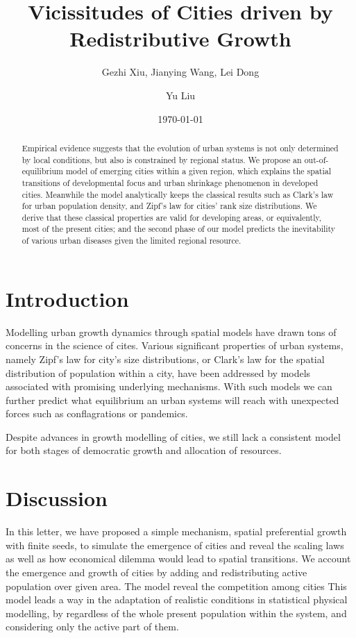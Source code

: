 \documentclass[reprint,unsortedaddress,amsmath,amssymb,aps,prl,showkeys]{revtex4-2}
\begin{document}
\title{Vicissitudes of Cities driven by Redistributive Growth}
\author{Gezhi Xiu, Jianying Wang, Lei Dong}
\author{Yu Liu}
\date{\today}

\begin{abstract}
    Empirical evidence suggests that the evolution of urban systems is not only determined by local conditions, but also is constrained by regional status. We propose an out-of-equilibrium model of emerging cities within a given region, which explains the spatial transitions of developmental focus and urban shrinkage phenomenon in developed cities. Meanwhile the model analytically keeps the classical results such as Clark's law for urban population density, and Zipf's law for cities' rank size distributions. We derive that these classical properties are valid for developing areas, or equivalently, most of the present cities; and the second phase of our model predicts the inevitability of various urban diseases given the limited regional resource. 
\end{abstract}
\maketitle
\section{Introduction}

Modelling urban growth dynamics through spatial models have drawn tons of concerns in the science of cites. Various significant properties of urban systems, namely Zipf's law for city's size distributions, or Clark's law for the spatial distribution of population within a city, have been addressed by models associated with promising underlying mechanisms. With such models we can further predict what equilibrium an urban systems will reach with unexpected forces such as conflagrations or pandemics. 

Despite advances in growth modelling of cities, we still lack a consistent model for both stages of democratic growth and allocation of resources.


\section{Discussion}


In this letter, we have proposed a simple mechanism, spatial preferential growth with finite seeds, to simulate the emergence of cities and reveal the scaling laws as well as how economical dilemma would lead to spatial transitions. We account the emergence and growth of cities by adding and redistributing active population over given area. The model reveal the competition among cities
This model leads a way in the adaptation of realistic conditions in statistical physical modelling, by regardless of the whole present population within the system, and considering only the active part of them. 
\end{document}
